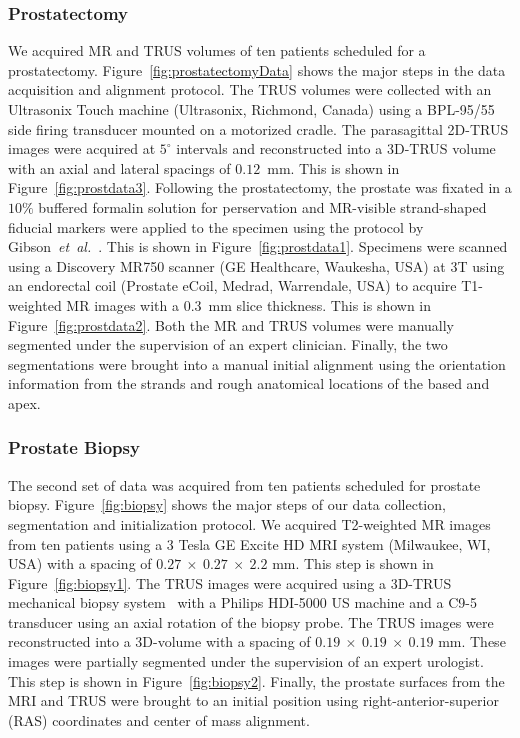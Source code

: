 \documentclass[journal]{IEEEtran}
\begin{document}
\subsubsection{Prostatectomy}\label{sec:data1}
We acquired MR and TRUS volumes of ten patients scheduled for a prostatectomy. Figure~\ref{fig:prostatectomyData} shows the major steps in the data acquisition and alignment protocol. The TRUS volumes were collected with an Ultrasonix Touch machine (Ultrasonix, Richmond, Canada) using a BPL-95/55 side firing transducer mounted on a motorized cradle. The parasagittal 2D-TRUS images were acquired at $5^\circ$ intervals and reconstructed into a 3D-TRUS volume with an axial and lateral spacings of $0.12$~mm. This is shown in Figure~\ref{fig:prostdata3}. Following the prostatectomy, the prostate was fixated in a $10\%$ buffered formalin solution for perservation and MR-visible strand-shaped fiducial markers were applied to the specimen using the protocol by Gibson~\textit{et~al.}~\cite{Gibson12a}. This is shown in Figure~\ref{fig:prostdata1}. Specimens were scanned using a Discovery MR750 scanner (GE Healthcare, Waukesha, USA) at 3T using an endorectal coil (Prostate eCoil, Medrad, Warrendale, USA) to acquire T1-weighted MR images with a $0.3$~mm slice thickness. This is shown in Figure~\ref{fig:prostdata2}. Both the MR and TRUS volumes were manually segmented under the supervision of an expert clinician. Finally, the two segmentations were brought into a manual initial alignment using the orientation information from the strands and rough anatomical locations of the based and apex.
\subsubsection{Prostate Biopsy}\label{sec:data2}
The second set of data was acquired from ten patients scheduled for prostate biopsy. Figure~\ref{fig:biopsy} shows the major steps of our data collection, segmentation and initialization protocol. We acquired T2-weighted MR images from ten patients using a 3 Tesla GE Excite HD MRI system (Milwaukee, WI, USA) with a spacing of $0.27~\times~0.27~\times~2.2$ mm. This step is shown in Figure~\ref{fig:biopsy1}. The TRUS images were acquired using a 3D-TRUS mechanical biopsy system~\cite{Bax08a} with a Philips HDI-5000 US machine and a C9-5 transducer using an axial rotation of the biopsy probe. The TRUS images were reconstructed into a 3D-volume with a spacing of $0.19~\times~0.19~\times~0.19$ mm. These images were partially segmented under the supervision of an expert urologist. This step is shown in Figure~\ref{fig:biopsy2}. Finally, the prostate surfaces from the MRI and TRUS were brought to an initial position using right-anterior-superior (RAS) coordinates and center of mass alignment.
\end{document}
